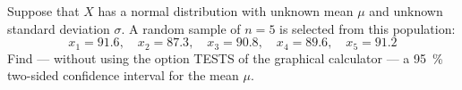 Suppose that $X$ has a normal distribution with unknown mean $\mu$ and unknown standard deviation $\sigma$.
A random sample of $n = 5$ is selected from this population:
\[
    x_1 = 91.6, \quad x_2 = 87.3, \quad x_3 = 90.8, \quad x_4 = 89.6, \quad x_5 = 91.2
\]
Find --- without using the option TESTS of the graphical calculator --- a \SI{95}{\percent} two-sided confidence interval for the mean $\mu$.